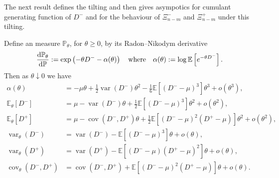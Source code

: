 \documentclass[draft]{scrartcl}
\newcommand{\E}{\mathbb E}
\newcommand{\littleo}{o}
\newcommand{\defeq}{:=}
\renewcommand{\Pr}{\mathbb P}
\DeclareMathOperator{\var}{var}
\DeclareMathOperator{\cov}{cov}
\begin{document}
The next result defines the tilting and then gives asympotics for cumulant generating function of $D^-$ and for the behaviour of $\Xi^-_{n-m}$ and $\Xi^+_{n-m}$ under this tilting.

\begin{lemma}
    \label{lem:asym-expansions}
    Define an measure $\Pr_{\theta}$, for $\theta \geq 0$, by its Radon--Nikodym derivative
    \begin{equation}
        \diff{\Pr_{\theta}}{\Pr} \defeq \exp\left( - \theta D^- - \alpha(\theta) \right)
        \quad \text{where} \quad
        \alpha(\theta) \defeq \log \E \left[ e^{-\theta D^-} \right].
    \end{equation}
    Then as $\theta \downarrow 0$ we have
    \begin{align}
        \alpha(\theta) &= -\mu \theta + \tfrac{1}{2}\var(D^-) \theta^2 - \tfrac{1}{6} \E \left[ (D^- - \mu)^3 \right] \theta^3 + \littleo(\theta^3), \\
        \E_{\theta}[D^-] &= \mu - \var(D^-) \theta + \tfrac{1}{2} \E \left[ (D^- - \mu)^3 \right] \theta^2 + \littleo(\theta^2), \\
        \E_{\theta}[D^+] &= \mu - \cov(D^-, D^+) \theta + \tfrac{1}{2} \E \left[ (D^- - \mu)^2 (D^+ - \mu) \right] \theta^2 + \littleo(\theta^2), \\
        \var_{\theta}(D^-) &= \var(D^-) - \E \left[ (D^- - \mu)^3 \right] \theta + \littleo(\theta), \\
        \var_{\theta}(D^+) &= \var(D^+) - \E \left[ (D^- - \mu)(D^+ - \mu)^2 \right] \theta + \littleo(\theta), \\
        \cov_{\theta}(D^-, D^+) &= \cov(D^-, D^+) + \E \left[ (D^- - \mu)^2 (D^+ - \mu) \right] \theta + \littleo(\theta).
    \end{align}
\end{lemma}
\end{document}
